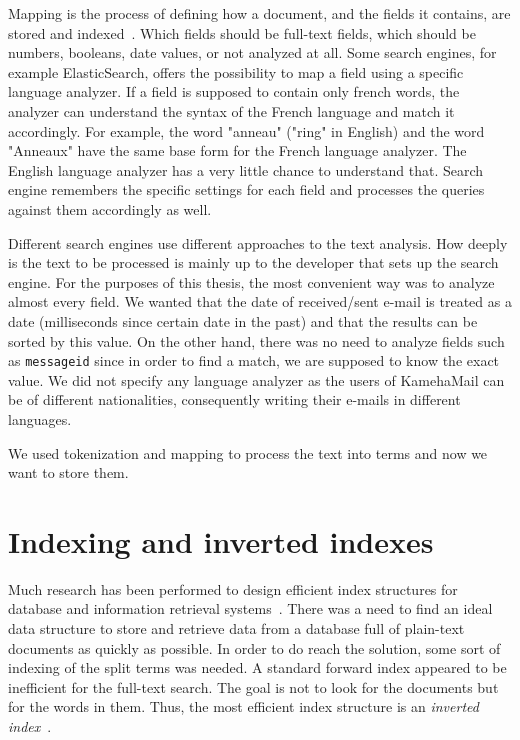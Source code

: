 Mapping is the process of defining how a document, and the fields it contains, are stored and indexed~\cite{elastic}. Which fields should be full-text fields, which should be numbers, booleans, date values, or not analyzed at all. Some search engines, for example ElasticSearch, offers the possibility to map a field using a specific language analyzer. If a field is supposed to contain only french words, the analyzer can understand the syntax of the French language and match it accordingly. For example, the word "anneau" ("ring" in English) and the word "Anneaux" have the same base form for the French language analyzer. The English language analyzer has a very little chance to understand that. Search engine remembers the specific settings for each field and processes the queries against them accordingly as well.

Different search engines use different approaches to the text analysis. How deeply is the text to be processed is mainly up to the developer that sets up the search engine.
For the purposes of this thesis, the most convenient way was to analyze almost every field. We wanted that the date of received/sent e-mail is treated as a date (milliseconds since certain date in the past) and that the results can be sorted by this value. On the other hand, there was no need to analyze fields such as \texttt{messageid} since in order to find a match, we are supposed to know the exact value. 
We did not specify any language analyzer as the users of KamehaMail can be of different nationalities, consequently writing their e-mails in different languages.

We used tokenization and mapping to process the text into terms and now we want to store them.
\section{Indexing and inverted indexes}
\label{index}
Much research has been performed to design efficient
index structures for database and information retrieval
systems~\cite{structs}. There was a need to find an ideal data structure to store and retrieve data from a database full of plain-text documents as quickly as possible. In order to do reach the solution, some sort of indexing of the split terms was needed.
A standard forward index appeared to be inefficient for the full-text search. The goal is not to look for the documents but for the words in them. Thus, the most efficient index structure is an \emph{inverted index}~\cite{invertedfiles}.

